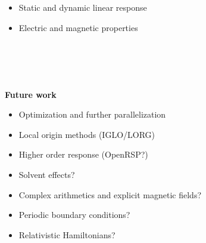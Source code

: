 \begin{frame}
\begin{itemize}
        \item   Static and dynamic linear response
	\item	Electric and magnetic properties
    \end{itemize}
    \ \\
    \ \\
    \ \\
    \ \\
    \pause
    \textbf{Future work}
    \begin{itemize}
        \item   Optimization and further parallelization
        \item   Local origin methods (IGLO/LORG)
        \item   Higher order response (OpenRSP?)
        \item   Solvent effects?
        \item   Complex arithmetics and explicit magnetic fields?
        \item   Periodic boundary conditions?
        \item   Relativistic Hamiltonians?
    \end{itemize}
\end{frame}

